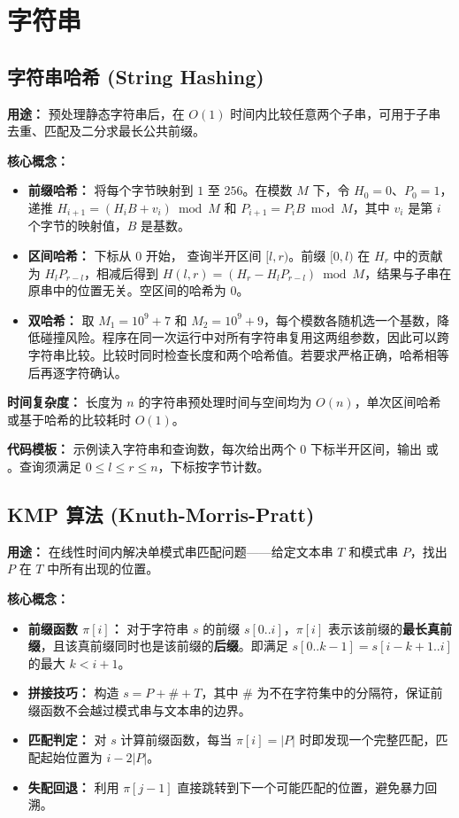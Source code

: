 \section{字符串}

\subsection{字符串哈希 (String Hashing)}

\textbf{用途：} 预处理静态字符串后，在 $O(1)$ 时间内比较任意两个子串，可用于子串去重、匹配及二分求最长公共前缀。

\textbf{核心概念：}
\begin{itemize}
  \item \textbf{前缀哈希：} 将每个字节映射到 $1$ 至 $256$。在模数 $M$ 下，令 $H_0=0$、$P_0=1$，递推 $H_{i+1}=(H_i B+v_i)\bmod M$ 和 $P_{i+1}=P_i B\bmod M$，其中 $v_i$ 是第 $i$ 个字节的映射值，$B$ 是基数。
  \item \textbf{区间哈希：} 下标从 $0$ 开始， 查询半开区间 $[l,r)$。前缀 $[0,l)$ 在 $H_r$ 中的贡献为 $H_l P_{r-l}$，相减后得到 $H(l,r)=(H_r-H_l P_{r-l})\bmod M$，结果与子串在原串中的位置无关。空区间的哈希为 $0$。
  \item \textbf{双哈希：} 取 $M_1=10^9+7$ 和 $M_2=10^9+9$，每个模数各随机选一个基数，降低碰撞风险。程序在同一次运行中对所有字符串复用这两组参数，因此可以跨字符串比较。比较时同时检查长度和两个哈希值。若要求严格正确，哈希相等后再逐字符确认。
\end{itemize}

\textbf{时间复杂度：} 长度为 $n$ 的字符串预处理时间与空间均为 $O(n)$，单次区间哈希或基于哈希的比较耗时 $O(1)$。

\textbf{代码模板：} 示例读入字符串和查询数，每次给出两个 $0$ 下标半开区间，输出  或 。查询须满足 $0\le l\le r\le n$，下标按字节计数。



\subsection{KMP 算法 (Knuth-Morris-Pratt)}

\textbf{用途：} 在线性时间内解决单模式串匹配问题——给定文本串 $T$ 和模式串 $P$，找出 $P$ 在 $T$ 中所有出现的位置。

\textbf{核心概念：}
\begin{itemize}
  \item \textbf{前缀函数 $\pi[i]$：} 对于字符串 $s$ 的前缀 $s[0..i]$，$\pi[i]$ 表示该前缀的\textbf{最长真前缀}，且该真前缀同时也是该前缀的\textbf{后缀}。即满足 $s[0..k-1] = s[i-k+1..i]$ 的最大 $k < i+1$。
  \item \textbf{拼接技巧：} 构造 $s = P + \# + T$，其中 $\#$ 为不在字符集中的分隔符，保证前缀函数不会越过模式串与文本串的边界。
  \item \textbf{匹配判定：} 对 $s$ 计算前缀函数，每当 $\pi[i] = |P|$ 时即发现一个完整匹配，匹配起始位置为 $i - 2|P|$。
  \item \textbf{失配回退：} 利用 $\pi[j-1]$ 直接跳转到下一个可能匹配的位置，避免暴力回溯。
\end{itemize}

